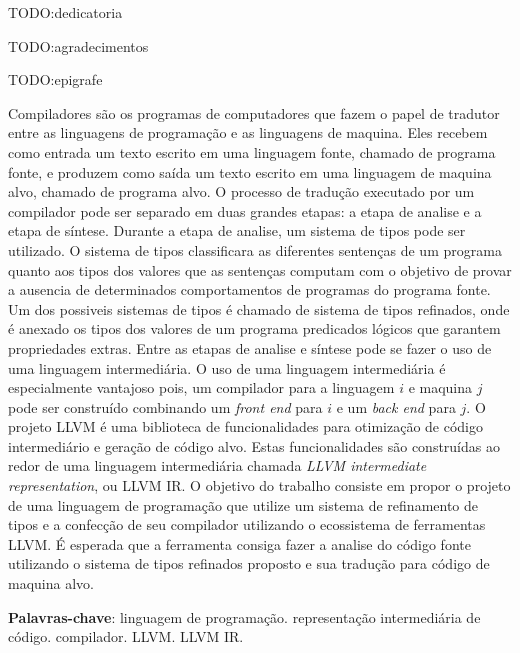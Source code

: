 \documentclass[
  english,
  lmodern,
  oneside
]{ufsc-thesis-rn46-2019/ufsc-thesis-rn46-2019}
\begin{document}
\pretextual{}
\imprimircapa{}
\imprimirfolhaderosto*
\protect%
\imprimirfolhadecertificacao{}



\begin{dedicatoria}
  TODO:\@ dedicatoria
\end{dedicatoria}

\begin{agradecimentos}
  TODO:\@ agradecimentos
\end{agradecimentos}

\begin{epigrafe}
  TODO:\@ epigrafe
\end{epigrafe}


\begin{resumo}[Resumo]
Compiladores são os programas de computadores que fazem o papel de tradutor entre as linguagens de programação e as linguagens de maquina.
Eles recebem como entrada um texto escrito em uma linguagem fonte, chamado de programa fonte, e produzem como saída um texto escrito em uma linguagem de maquina alvo, chamado de programa alvo.
O processo de tradução executado por um compilador pode ser separado em duas grandes etapas: a etapa de analise e a etapa de síntese.
Durante a etapa de analise, um sistema de tipos pode ser utilizado.
O sistema de tipos classificara as diferentes sentenças de um programa quanto aos tipos dos valores que as sentenças computam com o objetivo de provar a ausencia de determinados comportamentos de programas do programa fonte.
Um dos possiveis sistemas de tipos é chamado de sistema de tipos refinados, onde é anexado os tipos dos valores de um programa predicados lógicos que garantem propriedades extras.
Entre as etapas de analise e síntese pode se fazer o uso de uma linguagem intermediária.
O uso de uma linguagem intermediária é especialmente vantajoso pois, um compilador para a linguagem $i$ e maquina $j$ pode ser construído combinando um \textit{front end} para $i$ e um \textit{back end} para $j$.
O projeto LLVM é uma biblioteca de funcionalidades para otimização de código intermediário e geração de código alvo.
Estas funcionalidades são construídas ao redor de uma linguagem intermediária chamada \textit{LLVM intermediate representation}, ou LLVM IR\@.
O objetivo do trabalho consiste em propor o projeto de uma linguagem de programação que utilize um sistema de refinamento de tipos e a confecção de seu compilador utilizando o ecossistema de ferramentas LLVM\@.
É esperada que a ferramenta consiga fazer a analise do código fonte utilizando o sistema de tipos refinados proposto e sua tradução para código de maquina alvo.

\vspace{\onelineskip}
\noindent
\textbf{Palavras-chave}: linguagem de programação\@. representação intermediária de código\@. compilador\@. LLVM\@. LLVM IR\@.
\end{resumo}
\end{document}
